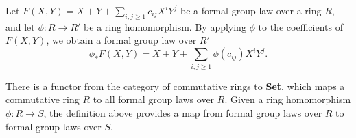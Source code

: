 





\begin{definition}
    Let $F(X,Y)= X + Y + \sum_{i, j \ge 1} c_{ij} X ^i Y^j$ be a formal group law over a ring $R$,
    and let $\phi : R \to R'$ be a ring homomorphism.
    By applying
    $\phi$ to the coefficients of $F(X,Y)$, we obtain a formal group law over $R'$
    \begin{equation*}
        \phi_* F(X,Y) = X + Y + \sum_{i,j \ge 1} \phi (c_{ij}) X ^i Y^j.
    \end{equation*}
    \label{defn: pushforward of coeff ring}
\end{definition}

\begin{remark}
    There is a functor from the category of commutative rings to \textbf{Set}, which maps a commutative ring
    $R$ to all formal group laws over $R$. Given a ring homomorphism $\phi : R \to S$, the definition
    above provides a map from formal group laws over $R$ to formal group laws over $S$.

\end{remark}
